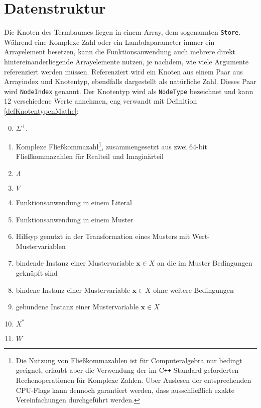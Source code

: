 \section{Datenstruktur}
Die Knoten des Termbaumes liegen in einem Array, dem sogenannten \verb|Store|. Während eine Komplexe Zahl oder ein Lambdaparameter immer ein Arrayelement besetzen, kann die Funktionsanwendung auch mehrere direkt hintereinanderliegende Arrayelemente nutzen, je nachdem, wie viele Argumente referenziert werden müssen. Referenziert wird ein Knoten aus einem Paar aus Arrayindex und Knotentyp, ebendfalls dargestellt als natürliche Zahl. Dieses Paar wird \verb|NodeIndex| genannt. Der Knotentyp wird als \verb|NodeType| bezeichnet und kann 12 verschiedene Werte annehmen, eng verwandt mit Definition \ref{defKnotentypenMathe}:
\begin{enumerate}
	\setcounter{enumi}{-1} %
	\item {$\Sigma^+$.}
	\item {Komplexe Fließkommazahl\footnote{Die Nutzung von Fließkommazahlen ist für Computeralgebra nur bedingt geeignet, erlaubt aber die Verwendung der im C\texttt{++} Standard geforderten Rechenoperationen für Komplexe Zahlen. Über Auslesen der entsprechenden CPU-Flags kann dennoch garantiert werden, dass ausschließlich exakte Vereinfachungen durchgeführt werden.}, zusammengesetzt aus zwei 64-bit Fließkommazahlen für Realteil und Imaginärteil}
	\item {$\Lambda$}
	\item {$V$}
	\item {Funktionsanwendung in einem Literal}
	\item {Funktionsanwendung in einem Muster}
	\item {Hilfsyp genutzt in der Transformation eines Musters mit Wert-Mustervariablen}
	\item {bindende Instanz einer Mustervariable $\mathbf x \in X$ an die im Muster Bedingungen geknüpft sind}
	\item {bindene Instanz einer Mustervariable $\mathbf x \in X$ ohne weitere Bedingungen}
	\item {gebundene Instanz einer Mustervariable $\mathbf x \in X$}
	\item {$X^*$}
	\item {$W$}
\end{enumerate}
